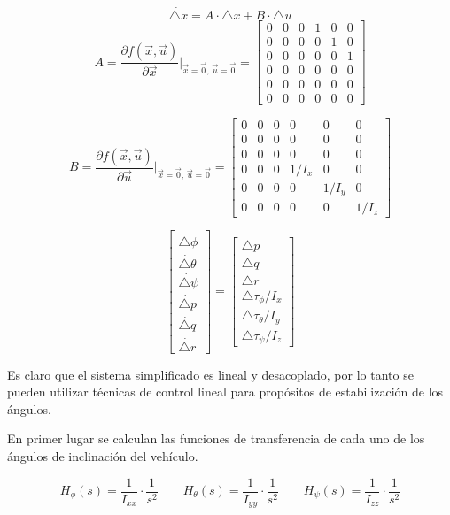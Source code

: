 \documentclass[../main.tex]{subfiles}
\begin{document}
\[
\dot{\triangle x}=A\cdot\triangle x+B\cdot\triangle u
\]
\[
A=\frac{\partial f(\vec{x},\vec{u})}{\partial\vec{x}}\bigg|_{\vec{x}=\vec{0},\,\vec{u}=\vec{0}}=\begin{bmatrix}0 & 0 & 0 & 1 & 0 & 0\\
0 & 0 & 0 & 0 & 1 & 0\\
0 & 0 & 0 & 0 & 0 & 1\\
0 & 0 & 0 & 0 & 0 & 0\\
0 & 0 & 0 & 0 & 0 & 0\\
0 & 0 & 0 & 0 & 0 & 0
\end{bmatrix}
\]


\[
B=\frac{\partial f(\vec{x},\vec{u})}{\partial\vec{u}}\bigg|_{\vec{x}=\vec{0},\,\vec{u}=\vec{0}}=\begin{bmatrix}0 & 0 & 0 & 0 & 0 & 0\\
0 & 0 & 0 & 0 & 0 & 0\\
0 & 0 & 0 & 0 & 0 & 0\\
0 & 0 & 0 & 1/I_{x} & 0 & 0\\
0 & 0 & 0 & 0 & 1/I_{y} & 0\\
0 & 0 & 0 & 0 & 0 & 1/I_{z}
\end{bmatrix}
\]


\[
\begin{bmatrix}\dot{\triangle\phi}\\
\dot{\triangle\theta}\\
\dot{\triangle\psi}\\
\dot{\triangle p}\\
\dot{\triangle q}\\
\dot{\triangle r}
\end{bmatrix}=\begin{bmatrix}\triangle p\\
\triangle q\\
\triangle r\\
\triangle\tau_{\phi}/I_{x}\\
\triangle\tau_{\theta}/I_{y}\\
\triangle\tau_{\psi}/I_{z}
\end{bmatrix}
\]

Es claro que el sistema simplificado es lineal y desacoplado, por
lo tanto se pueden utilizar técnicas de control lineal para propósitos
de estabilización de los ángulos. 

En primer lugar se calculan las funciones de transferencia de cada
uno de los ángulos de inclinación del vehículo.

\[
H_{\phi}(s)=\frac{1}{I_{xx}}\cdot\frac{1}{s^{2}}\qquad H_{\theta}(s)=\frac{1}{I_{yy}}\cdot\frac{1}{s^{2}}\qquad H_{\psi}(s)=\frac{1}{I_{zz}}\cdot\frac{1}{s^{2}}
\]
\end{document}
